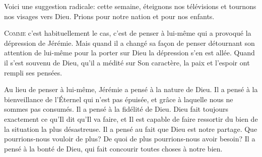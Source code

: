 Voici une suggestion radicale: cette semaine, éteignons nos télévisions
 et tournons nos visages vers Dieu.
 Prions pour notre nation et pour nos enfants. 

\dvrule








\lettrine{C}{omme} c'est habituellement le cas, c'est de penser à lui-même
 qui a provoqué la dépression de Jérémie.
 Mais quand il a changé sa fa\c{c}on de penser
 \ocadr détournant son attention de lui-même pour la porter sur Dieu \fcadr{}
 la dépression s'en est allée. Quand il s'est souvenu de Dieu,
 qu'il a médité sur Son caractère, la paix et l'espoir ont rempli ses pensées. 


Au lieu de penser à lui-même, Jérémie a pensé à la nature de Dieu.
 Il a pensé à la bienveillance de l'Éternel qui n'est pas épuisée,
 et grâce à laquelle nous ne sommes pas consumés.
 Il a pensé à la fidélité de Dieu. Dieu fait toujours exactement
 ce qu'Il dit qu'Il va faire, et Il est capable de faire ressortir du bien
 de la situation la plus désastreuse. Il a pensé au fait que Dieu
 est notre partage. Que pourrions-nous vouloir de plus?
 De quoi de plus pourrions-nous avoir besoin?
 Il a pensé à la bonté de Dieu,
 qui fait concourir toutes choses à notre bien. 

